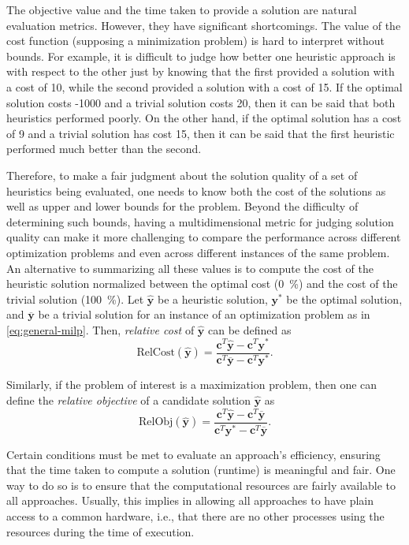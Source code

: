 The objective value and the time taken to provide a solution are natural evaluation metrics.
However, they have significant shortcomings.
The value of the cost function (supposing a minimization problem) is hard to interpret without bounds.
For example, it is difficult to judge how better one heuristic approach is with respect to the other just by knowing that the first provided a solution with a cost of 10, while the second provided a solution with a cost of 15.
If the optimal solution costs -1000 and a trivial solution costs 20, then it can be said that both heuristics performed poorly.
On the other hand, if the optimal solution has a cost of 9 and a trivial solution has cost 15, then it can be said that the first heuristic performed much better than the second.

Therefore, to make a fair judgment about the solution quality of a set of heuristics being evaluated, one needs to know both the cost of the solutions as well as upper and lower bounds for the problem.
Beyond the difficulty of determining such bounds, having a multidimensional metric for judging solution quality can make it more challenging to compare the performance across different optimization problems and even across different instances of the same problem.
An alternative to summarizing all these values is to compute the cost of the heuristic solution normalized between the optimal cost (0~\%) and the cost of the trivial solution (100~\%).
Let $\hat{\bm{y}}$ be a heuristic solution, $\bm{y}^*$ be the optimal solution, and $\overline{\bm{y}}$ be a trivial solution for an instance of an optimization problem as in \eqref{eq:general-milp}.
Then, \emph{relative cost} of $\hat{\bm{y}}$ can be defined as
\begin{equation}
    \text{RelCost}(\hat{\bm{y}}) = \frac{\bm{c}^{T} \hat{\bm{y}} - \bm{c}^{T} \bm{y}^*}{\bm{c}^{T}\overline{\bm{y}} - \bm{c}^{T}\bm{y}^*}
.\end{equation}

Similarly, if the problem of interest is a maximization problem, then one can define the \emph{relative objective} of a candidate solution $\hat{\bm{y}}$ as
\begin{equation}\label{eq:relobj}
    \text{RelObj}(\hat{\bm{y}}) = \frac{\bm{c}^{T} \hat{\bm{y}}  - \bm{c}^{T}\overline{\bm{y}}}{\bm{c}^{T}\bm{y}^* - \bm{c}^{T}\overline{\bm{y}}}
.\end{equation}

Certain conditions must be met to evaluate an approach's efficiency, ensuring that the time taken to compute a solution (runtime) is meaningful and fair.
One way to do so is to ensure that the computational resources are fairly available to all approaches.
Usually, this implies in allowing all approaches to have plain access to a common hardware, i.e., that there are no other processes using the resources during the time of execution.

